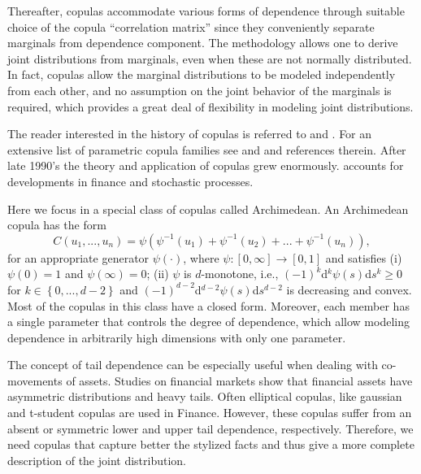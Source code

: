 \documentclass[a4paper,10pt]{article}
\begin{document}
Thereafter, copulas accommodate various forms of dependence through suitable choice of the copula ``correlation matrix'' since they conveniently separate marginals from dependence component. The methodology allows one to derive joint distributions from marginals, even when these are not normally distributed. In fact, copulas allow the marginal distributions to be modeled independently from each other, and no assumption on the joint behavior of the marginals is required, which provides a great deal of flexibility in modeling joint distributions.

\bigskip

The reader interested in the history of copulas is referred to \citet*{%
	schweizer2011} and \citet*{nelsen06}. For an extensive list of parametric
copula families see \citet*{joe97} and \citet*{nelsen06} and references
therein. After late 1990's the theory and application of copulas grew
enormously. \citet*{cherubini04} accounts for developments in finance and
stochastic processes.

Here we focus in a special class of copulas called Archimedean. An
Archimedean copula has the form
\begin{equation}
C\left( u_{1},...,u_{n}\right) =\psi \left( \psi ^{-1}\left( u_{1}\right)
+\psi ^{-1}\left( u_{2}\right) +...+\psi ^{-1}\left( u_{n}\right) \right) ,
\end{equation}%
for an appropriate generator $\psi \left( \cdot \right) $, where $\psi :%
\left[ 0,\infty \right] \rightarrow \left[ 0,1\right] $ and satisfies (i) $%
\psi (0)=1$ and $\psi (\infty )=0$; (ii) $\psi $ is $d$-monotone, i.e., $%
(-1)^{k}$d$^{k}\psi \left( s\right) $d$s^{k}\geq 0$ for $k\in \left\{
0,...,d-2\right\} $ and $(-1)^{d-2}$d$^{d-2}\psi \left( s\right) $d$s^{d-2}$
is decreasing and convex. Most of the copulas in this class have a closed
form. Moreover, each member has a single parameter that controls the degree
of dependence, which allow modeling dependence in arbitrarily high
dimensions with only one parameter.

The concept of tail dependence can be especially useful when dealing with
co-movements of assets. Studies on financial markets show that financial
assets have asymmetric distributions and heavy tails. Often elliptical
copulas, like gaussian and t-student copulas are used in Finance. However,
these copulas suffer from an absent or symmetric lower and upper tail
dependence, respectively. Therefore, we need copulas that capture better the
stylized facts and thus give a more complete description of the joint
distribution.
\end{document}
